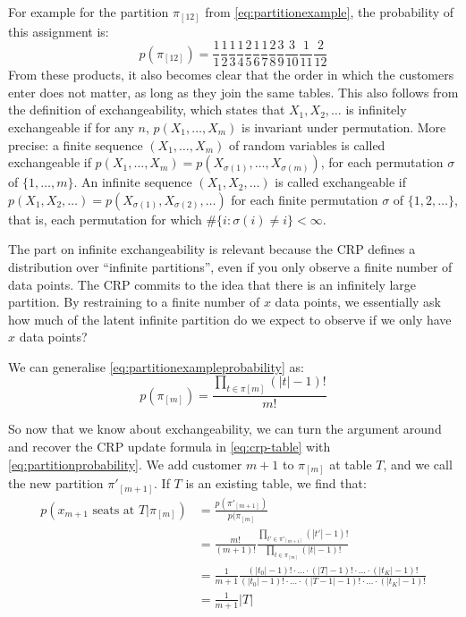 For example for the partition $\pi_{[12]}$ from \cref{eq:partitionexample}, the probability of this assignment is:
\begin{equation}\label{eq:partitionexampleprobability}
	p(\pi_{[12]}) = \frac{1}{1}\frac{1}{2}\frac{1}{3}\frac{1}{4}\frac{2}{5}\frac{1}{6}\frac{1}{7}\frac{2}{8}\frac{3}{9}\frac{3}{10}\frac{1}{11}\frac{2}{12}
\end{equation}
From these products, it also becomes clear that the order in which the customers enter does not matter, as long as they join the same tables. This also follows from the definition of exchangeability, which states that $X_1, X_2, \ldots$ is infinitely exchangeable if for any $n$, $p(X_1,\ldots,X_m)$ is invariant under permutation. More precise: a finite sequence $(X_1, \ldots, X_m)$ of random variables is called exchangeable if $p(X_1,\ldots,X_m) = p(X_{\sigma(1)},\ldots,X_{\sigma(m)})$, for each permutation $\sigma$ of $\{1,\ldots,m\}$. An infinite sequence $(X_1,X_2,\ldots)$ is called exchangeable if $p(X_1,X_2,\ldots)=p(X_{\sigma(1)},X_{\sigma(2)},\ldots)$ for each finite permutation $\sigma$ of $\{1,2,\ldots\}$, that is, each permutation for which $\#\{i: \sigma(i)\neq i\} < \infty$.

The part on infinite exchangeability is relevant because the CRP defines a distribution over ``infinite partitions'', even if you only observe a finite number of data points. The CRP commits to the idea that there is an infinitely large partition. By restraining to a finite number of $x$ data points, we essentially ask how much of the latent infinite partition do we expect to observe if we only have $x$ data points?

We can generalise \cref{eq:partitionexampleprobability} as:
\begin{equation}\label{eq:partitionprobability}
	p(\pi_{[m]}) = \frac{\prod_{t\in\pi{[m]}} (|t|-1)!}{m!}
\end{equation}

So now that we know about exchangeability, we can turn the argument around and recover the CRP update formula in \cref{eq:crp-table} with \cref{eq:partitionprobability}. We add customer $m+1$ to $\pi_{[m]}$ at table $T$, and we call the new partition $\pi'_{[m+1]}$. If $T$ is an existing table, we find that:
\begin{equation}
\begin{split}
	p(x_{m+1}\text{ seats at }T|\pi_{[m]}) &= \frac{p(\pi'_{[m+1]})}{p(\pi_{[m]}} \\
     &= \frac{m!}{(m+1)!}\frac{\prod_{t'\in\pi'_{[m+1]}}(|t'|-1)!}{\prod_{t\in\pi_{[m]}}(|t|-1)!} \\
     &= \frac{1}{m+1}\frac{(|t_0|-1)! \cdot \ldots \cdot (|T|-1)! \cdot\ldots\cdot (|t_K|-1)!}{(|t_0|-1)! \cdot \ldots \cdot (|T-1|-1)! \cdot\ldots\cdot (|t_K|-1)!} \\
     &= \frac{1}{m+1}|T|
\end{split}
\end{equation}


